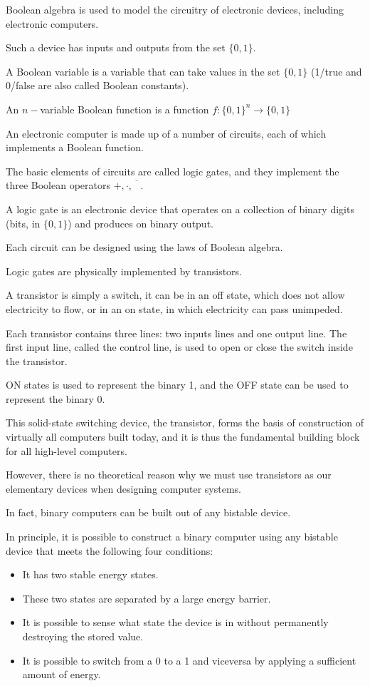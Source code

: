 \documentclass{article}
\begin{document}
Boolean algebra is used to model the circuitry of electronic devices, including electronic computers. 

Such a device has inputs and outputs from the set $\{0,1\}$.

A Boolean variable is a variable that can take values in the set $\{0,1\}$ (1/true and 0/false are also called Boolean constants). 

An $n-$variable Boolean function is a function $f: \{0,1\}^n \to \{0,1\}$

An electronic computer is made up of a number of circuits, each of which implements a Boolean function.

The basic elements of circuits are called logic gates, and they implement the three Boolean operators $+, \cdot, \overline{\phantom{A}}$.

A logic gate is an electronic device that operates on a collection of binary digits (bits, in $\{0,1\}$) and produces on binary output.

Each circuit can be designed using the laws of Boolean algebra. 

Logic gates are physically implemented by transistors. 

A transistor is simply a switch, it can be in an off state, which does not allow electricity to flow, or in an on state, in which electricity can pass unimpeded. 

Each transistor contains three lines: two inputs lines and one output line. The first input line, called the control line, is used to open or close the switch inside the transistor. 

ON states is used to represent the binary 1, and the OFF state can be used to represent the binary 0. 

This solid-state switching device, the transistor, forms the basis of construction of virtually all computers built today, and it is thus the fundamental building block for all high-level computers. 

However, there is no theoretical reason why we must use transistors as our elementary devices when designing computer systems. 

In fact, binary computers can be built out of any bistable device. 

In principle, it is possible to construct a binary computer using any bistable device that meets the following four conditions:
\begin{itemize}
    \item It has two stable energy states.
    \item These two states are separated by a large energy barrier.
    \item It is possible to sense what state the device is in without permanently destroying the stored value.
    \item It is possible to switch from a 0 to a 1 and viceversa by applying a sufficient amount of energy. 
\end{itemize}
\end{document}
